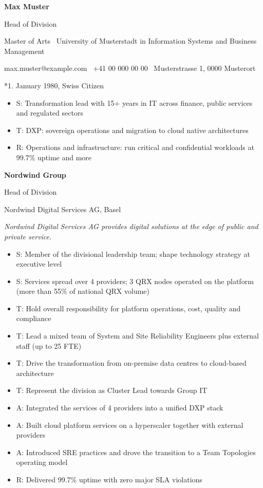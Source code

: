 \documentclass[10.5pt,a4paper]{article}
\newlength{\datewidth}
\newcommand{\companyheader}[2]{%
  \par\noindent\makebox[\datewidth][l]{\textbf{#1}}\textbf{#2}\par
}
\newcommand{\entrytwoline}[3]{%
  \par\noindent\makebox[\datewidth][l]{#1}#2\par
  \noindent\makebox[\datewidth][l]{}#3\par
}
\newcommand{\companydesc}[1]{\vspace{2pt}\textit{#1}\par}
\newenvironment{tightlist}{%
  \begin{itemize}[leftmargin=1.1em,itemsep=0pt,topsep=4pt,parsep=0pt,partopsep=0pt,label=\textbullet]
}{%
  \end{itemize}
}
\newcommand{\blockgap}{\vspace{8pt}}
\newcommand{\smallgap}{\vspace{4pt}}
\begin{document}
{\LARGE\bfseries Max Muster}\par
\smallgap
Head of Division\par
Master of Arts \textbar\ University of Musterstadt in Information Systems and Business Management\par
\blockgap
max.muster@example.com \textbar\ +41 00 000 00 00 \textbar\ Musterstrasse 1, 0000 Musterort\par
*1. January 1980, Swiss Citizen\par
\blockgap

\begin{tightlist}
  \item S: Transformation lead with 15+ years in IT across finance, public services and regulated sectors
  \item T: DXP: sovereign operations and migration to cloud native architectures
  \item R: Operations and infrastructure: run critical and confidential workloads at 99.7\% uptime and more
\end{tightlist}

\blockgap

\companyheader{04.2023 -- today}{Nordwind Group}
\entrytwoline{01.2026 -- today}{Head of Division}{Nordwind Digital Services AG, Basel}
\companydesc{Nordwind Digital Services AG provides digital solutions at the edge of public and private service.}

\begin{tightlist}
  \item S: Member of the divisional leadership team; shape technology strategy at executive level
  \item S: Services spread over 4 providers; 3 QRX nodes operated on the platform (more than 55\% of national QRX volume)
  \item T: Hold overall responsibility for platform operations, cost, quality and compliance
  \item T: Lead a mixed team of System and Site Reliability Engineers plus external staff (up to 25 FTE)
  \item T: Drive the transformation from on-premise data centres to cloud-based architecture
  \item T: Represent the division as Cluster Lead towards Group IT
  \item A: Integrated the services of 4 providers into a unified DXP stack
  \item A: Built cloud platform services on a hyperscaler together with external providers
  \item A: Introduced SRE practices and drove the transition to a Team Topologies operating model
  \item R: Delivered 99.7\% uptime with zero major SLA violations
\end{tightlist}
\end{document}
